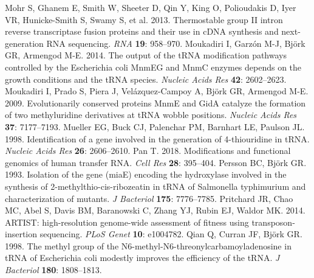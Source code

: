 \documentclass[times, twoside]{zHenriquesLab-StyleBioRxiv}
\begin{document}
\newline
\newline
Mohr S, Ghanem E, Smith W, Sheeter D, Qin Y, King O, Polioudakis D, Iyer VR, Hunicke-Smith S, Swamy S, et al. 2013. Thermostable group II intron reverse transcriptase fusion proteins and their use in cDNA synthesis and next-generation RNA sequencing. \textit{RNA} \textbf{19}: 958–970. 
\newline
\newline
Moukadiri I, Garzón M-J, Björk GR, Armengod M-E. 2014. The output of the tRNA modification pathways controlled by the Escherichia coli MnmEG and MnmC enzymes depends on the growth conditions and the tRNA species. \textit{Nucleic Acids Res} \textbf{42}: 2602–2623. 
\newline
\newline
Moukadiri I, Prado S, Piera J, Velázquez-Campoy A, Björk GR, Armengod M-E. 2009. Evolutionarily conserved proteins MnmE and GidA catalyze the formation of two methyluridine derivatives at tRNA wobble positions. \textit{Nucleic Acids Res} \textbf{37}: 7177–7193. 
\newline
\newline
Mueller EG, Buck CJ, Palenchar PM, Barnhart LE, Paulson JL. 1998. Identification of a gene involved in the generation of 4-thiouridine in tRNA. \textit{Nucleic Acids Res} \textbf{26}: 2606–2610. 
\newline
\newline
Pan T. 2018. Modifications and functional genomics of human transfer RNA. \textit{Cell Res} \textbf{28}: 395–404. 
\newline
\newline
Persson BC, Björk GR. 1993. Isolation of the gene (miaE) encoding the hydroxylase involved in the synthesis of 2-methylthio-cis-ribozeatin in tRNA of Salmonella typhimurium and characterization of mutants. \textit{J Bacteriol} \textbf{175}: 7776–7785. 
\newline
\newline
Pritchard JR, Chao MC, Abel S, Davis BM, Baranowski C, Zhang YJ, Rubin EJ, Waldor MK. 2014. ARTIST: high-resolution genome-wide assessment of fitness using transposon-insertion sequencing. \textit{PLoS Genet} \textbf{10}: e1004782. 
\newline
\newline
Qian Q, Curran JF, Björk GR. 1998. The methyl group of the N6-methyl-N6-threonylcarbamoyladenosine in tRNA of Escherichia coli modestly improves the efficiency of the tRNA. \textit{J Bacteriol} \textbf{180}: 1808–1813. 
\end{document}
